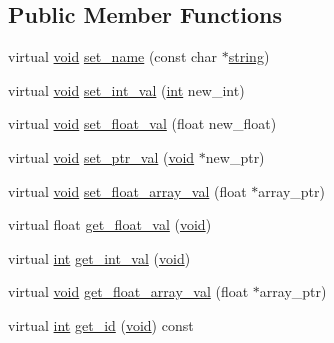 \subsection*{Public Member Functions}
\begin{DoxyCompactItemize}
\item 
virtual \hyperlink{wglext_8h_a9e6b7f1933461ef318bb000d6bd13b83}{void} \hyperlink{class_g_l_u_i___control_ad1bf0640802de0a40337cdbcf93a5ec6}{set\+\_\+name} (const char $\ast$\hyperlink{glext_8h_ae84541b4f3d8e1ea24ec0f466a8c568b}{string})
\item 
virtual \hyperlink{wglext_8h_a9e6b7f1933461ef318bb000d6bd13b83}{void} \hyperlink{class_g_l_u_i___control_a32ef6d11d6c62e344f17268dfb96aad6}{set\+\_\+int\+\_\+val} (\hyperlink{wglext_8h_a500a82aecba06f4550f6849b8099ca21}{int} new\+\_\+int)
\item 
virtual \hyperlink{wglext_8h_a9e6b7f1933461ef318bb000d6bd13b83}{void} \hyperlink{class_g_l_u_i___control_a231fe69a978a66b858727e50327bcf59}{set\+\_\+float\+\_\+val} (float new\+\_\+float)
\item 
virtual \hyperlink{wglext_8h_a9e6b7f1933461ef318bb000d6bd13b83}{void} \hyperlink{class_g_l_u_i___control_a9c732d42b7d5e418e59c307ef2d98d5c}{set\+\_\+ptr\+\_\+val} (\hyperlink{wglext_8h_a9e6b7f1933461ef318bb000d6bd13b83}{void} $\ast$new\+\_\+ptr)
\item 
virtual \hyperlink{wglext_8h_a9e6b7f1933461ef318bb000d6bd13b83}{void} \hyperlink{class_g_l_u_i___control_aa9a1c1e033c0e99e4710dfc4669660f4}{set\+\_\+float\+\_\+array\+\_\+val} (float $\ast$array\+\_\+ptr)
\item 
virtual float \hyperlink{class_g_l_u_i___control_a5b4f37b463259dfbf228b34b901a07cc}{get\+\_\+float\+\_\+val} (\hyperlink{wglext_8h_a9e6b7f1933461ef318bb000d6bd13b83}{void})
\item 
virtual \hyperlink{wglext_8h_a500a82aecba06f4550f6849b8099ca21}{int} \hyperlink{class_g_l_u_i___control_a3ee80f39e04a26e38bc5e16f0f8af539}{get\+\_\+int\+\_\+val} (\hyperlink{wglext_8h_a9e6b7f1933461ef318bb000d6bd13b83}{void})
\item 
virtual \hyperlink{wglext_8h_a9e6b7f1933461ef318bb000d6bd13b83}{void} \hyperlink{class_g_l_u_i___control_a98f514bf95d29320c175fe1d7d4ef13b}{get\+\_\+float\+\_\+array\+\_\+val} (float $\ast$array\+\_\+ptr)
\item 
virtual \hyperlink{wglext_8h_a500a82aecba06f4550f6849b8099ca21}{int} \hyperlink{class_g_l_u_i___control_a855a5f2c0267a303b39f685284913b40}{get\+\_\+id} (\hyperlink{wglext_8h_a9e6b7f1933461ef318bb000d6bd13b83}{void}) const 

\end{DoxyCompactItemize}
